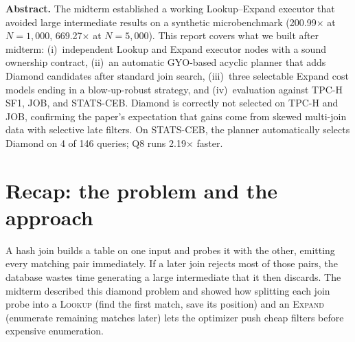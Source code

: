 \documentclass[10pt,twocolumn]{article}
\newcommand{\lookup}{\textsc{Lookup}}
\newcommand{\expand}{\textsc{Expand}}
\begin{document}

\noindent\textbf{Abstract.}
The midterm established a working Lookup--Expand executor that avoided large
intermediate results on a synthetic microbenchmark (200.99$\times$ at $N=1{,}000$,
669.27$\times$ at $N=5{,}000$). This report covers what we built after midterm:
(i)~independent Lookup and Expand executor nodes with a sound ownership contract,
(ii)~an automatic GYO-based acyclic planner that adds Diamond candidates after
standard join search, (iii)~three selectable Expand cost models ending in a
blow-up-robust strategy, and (iv)~evaluation against TPC-H SF1, JOB, and
STATS-CEB. Diamond is correctly not selected on TPC-H and JOB, confirming the
paper's expectation that gains come from skewed multi-join data with selective
late filters. On STATS-CEB, the planner automatically selects Diamond on
4 of 146 queries; Q8 runs 2.19$\times$ faster.

\section{Recap: the problem and the approach}
A hash join builds a table on one input and probes it with the other, emitting
every matching pair immediately. If a later join rejects most of those pairs,
the database wastes time generating a large intermediate that it then discards.
The midterm described this diamond problem and showed how splitting each join
probe into a \lookup{} (find the first match, save its position) and an
\expand{} (enumerate remaining matches later) lets the optimizer push cheap
filters before expensive enumeration.
\end{document}
